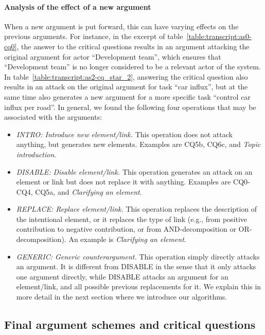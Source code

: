 \paragraph{Analysis of the effect of a new argument} When a new argument is put forward, this can have varying effects on the previous arguments. For instance, in the excerpt of table~\ref{table:transcript:as0-cq0}, the answer to the critical questions results in an argument attacking the original argument for actor ``Development team'', which ensures that ``Development team'' is no longer considered to be a relevant actor of the system. In table~\ref{table:transcript:as2-cq_star_2}, answering the critical question also results in an attack on the original argument for task ``car influx'', but at the same time also generates a new argument for a more specific task ``control car influx per road''. In general, we found the following four operations that may be associated with the arguments:

\begin{itemize}
\item \emph{INTRO: Introduce new element/link.} This operation does not attack anything, but generates new elements. Examples are CQ5b, CQ6c, and \emph{Topic introduction}.
\item \emph{DISABLE: Disable element/link.} This operation generates an attack on an element or link but does not replace it with anything. Examples are CQ0-CQ4, CQ5a, and \emph{Clarifying an element}.
\item \emph{REPLACE: Replace element/link.} This operation replaces the description of the intentional element, or it replaces the type of link (e.g., from positive contribution to negative contribution, or from AND-decomposition or OR-decomposition). An example is \emph{Clarifying an element}.
\item \emph{GENERIC: Generic counterargument.} This operation simply directly attacks an argument. It is different from DISABLE in the sense that it only attacks one argument directly, while DISABLE attacks an argument for an element/link, and all possible previous replacements for it. We explain this in more detail in the next section where we introduce our algorithms.
\end{itemize}

\subsection{Final argument schemes and critical questions}

